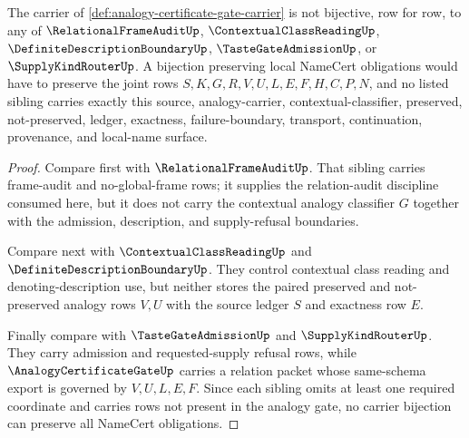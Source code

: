 \begin{theorem}
\label{thm:analogy-certificate-gate-independence-witness}
The carrier of \autoref{def:analogy-certificate-gate-carrier} is not bijective, row for row, to any of $\RelationalFrameAuditUp$, $\ContextualClassReadingUp$, $\DefiniteDescriptionBoundaryUp$, $\TasteGateAdmissionUp$, or $\SupplyKindRouterUp$. A bijection preserving local NameCert obligations would have to preserve the joint rows $S,K,G,R,V,U,L,E,F,H,C,P,N$, and no listed sibling carries exactly this source, analogy-carrier, contextual-classifier, preserved, not-preserved, ledger, exactness, failure-boundary, transport, continuation, provenance, and local-name surface.
\end{theorem}
\begin{proof}
Compare first with $\RelationalFrameAuditUp$. That sibling carries frame-audit and no-global-frame rows; it supplies the relation-audit discipline consumed here, but it does not carry the contextual analogy classifier $G$ together with the admission, description, and supply-refusal boundaries.

Compare next with $\ContextualClassReadingUp$ and $\DefiniteDescriptionBoundaryUp$. They control contextual class reading and denoting-description use, but neither stores the paired preserved and not-preserved analogy rows $V,U$ with the source ledger $S$ and exactness row $E$.

Finally compare with $\TasteGateAdmissionUp$ and $\SupplyKindRouterUp$. They carry admission and requested-supply refusal rows, while $\AnalogyCertificateGateUp$ carries a relation packet whose same-schema export is governed by $V,U,L,E,F$. Since each sibling omits at least one required coordinate and carries rows not present in the analogy gate, no carrier bijection can preserve all NameCert obligations.
\end{proof}



